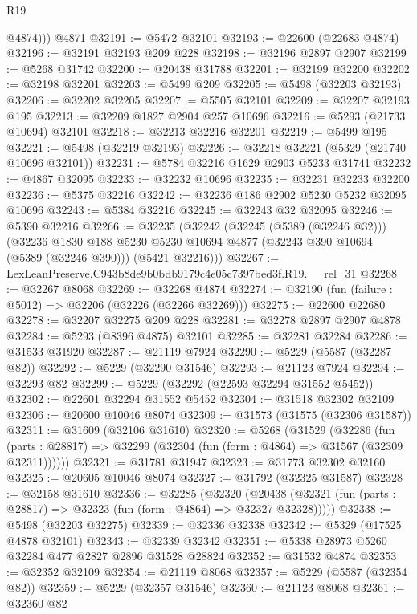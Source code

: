 \begin{lexlean}{R19}
\begin{coremodule}
          @4874)))
    @4871
@32191 := @5472 @32101
@32193 := @22600 (@22683 @4874)
@32196 := @32191 @32193 @209 @228
@32198 := @32196 @2897 @2907
@32199 := @5268 @31742
@32200 := @20438 @31788
@32201 := @32199 @32200
@32202 := @32198 @32201
@32203 := @5499 @209
@32205 := @5498 (@32203 @32193)
@32206 := @32202 @32205
@32207 := @5505 @32101
@32209 := @32207 @32193 @195
@32213 := @32209 @1827 @2904 @257 @10696
@32216 := @5293 (@21733 @10694) @32101
@32218 := @32213 @32216 @32201
@32219 := @5499 @195
@32221 := @5498 (@32219 @32193)
@32226 := @32218 @32221 (@5329 (@21740 @10696 @32101))
@32231 := @5784 @32216 @1629 @2903 @5233 @31741
@32232 := @4867 @32095
@32233 := @32232 @10696
@32235 := @32231 @32233 @32200
@32236 := @5375 @32216
@32242 := @32236 @186 @2902 @5230 @5232 @32095 @10696
@32243 := @5384 @32216
@32245 := @32243 @32 @32095
@32246 := @5390 @32216
@32266 := @32235
    (@32242
      (@32245 (@5389 (@32246 @32)))
      (@32236
        @1830
        @188
        @5230
        @5230
        @10694
        @4877
        (@32243 @390 @10694 (@5389 (@32246 @390)))
        (@5421 @32216)))
@32267 := LexLeanPreserve.C943b8de9b0bdb9179c4e05c7397bed3f.R19.__rel_31
@32268 := @32267 @8068
@32269 := @32268 @4874
@32274 := @32190 (fun (failure : @5012) => @32206 (@32226 (@32266 @32269)))
@32275 := @22600 @22680
@32278 := @32207 @32275 @209 @228
@32281 := @32278 @2897 @2907 @4878
@32284 := @5293 (@8396 @4875) @32101
@32285 := @32281 @32284
@32286 := @31533 @31920
@32287 := @21119 @7924
@32290 := @5229 (@5587 (@32287 @82))
@32292 := @5229 (@32290 @31546)
@32293 := @21123 @7924
@32294 := @32293 @82
@32299 := @5229 (@32292 (@22593 @32294 @31552 @5452))
@32302 := @22601 @32294 @31552 @5452
@32304 := @31518 @32302 @32109
@32306 := @20600 @10046 @8074
@32309 := @31573 (@31575 (@32306 @31587))
@32311 := @31609 (@32106 @31610)
@32320 := @5268
    (@31529
      (@32286
        (fun (parts : @28817) => @32299 (@32304 (fun (form : @4864) => @31567 (@32309 @32311))))))
@32321 := @31781 @31947
@32323 := @31773 @32302 @32160
@32325 := @20605 @10046 @8074
@32327 := @31792 (@32325 @31587)
@32328 := @32158 @31610
@32336 := @32285
    (@32320
      (@20438 (@32321 (fun (parts : @28817) => @32323 (fun (form : @4864) => @32327 @32328)))))
@32338 := @5498 (@32203 @32275)
@32339 := @32336 @32338
@32342 := @5329 (@17525 @4878 @32101)
@32343 := @32339 @32342
@32351 := @5338 @28973 @5260 @32284 @477 @2827 @2896 @31528 @28824
@32352 := @31532 @4874
@32353 := @32352 @32109
@32354 := @21119 @8068
@32357 := @5229 (@5587 (@32354 @82))
@32359 := @5229 (@32357 @31546)
@32360 := @21123 @8068
@32361 := @32360 @82

\end{coremodule}
\end{lexlean}

